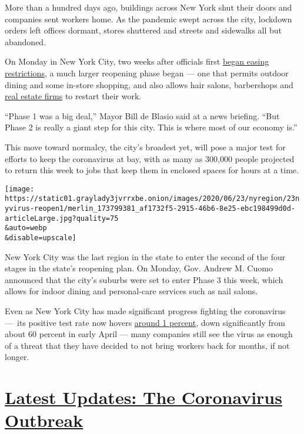 More than a hundred days ago, buildings across New York shut their doors
and companies sent workers home. As the pandemic swept across the city,
lockdown orders left offices dormant, stores shuttered and streets and
sidewalks all but abandoned.

On Monday in New York City, two weeks after officials first
\href{https://www.nytimes3xbfgragh.onion/2020/06/07/nyregion/new-york-reopening-coronavirus.html?module=inline}{began
easing restrictions}, a much larger reopening phase began --- one that
permits outdoor dining and some in-store shopping, and also allows hair
salons, barbershops and
\href{https://www.nytimes3xbfgragh.onion/2020/06/24/realestate/phase-2-showings.html}{real
estate firms} to restart their work.

``Phase 1 was a big deal,'' Mayor Bill de Blasio said at a news
briefing. ``But Phase 2 is really a giant step for this city. This is
where most of our economy is.''

This move toward normalcy, the city's broadest yet, will pose a major
test for efforts to keep the coronavirus at bay, with as many as 300,000
people projected to return this week to jobs that keep them in enclosed
spaces for hours at a time.

\texttt{[image: https://static01.graylady3jvrrxbe.onion/images/2020/06/23/nyregion/23nyvirus-reopen1/merlin\_173799381\_af1732f5-2915-46b6-8e25-ebc198499d0d-articleLarge.jpg?quality=75\\\&auto=webp\\\&disable=upscale]}

New York City was the last region in the state to enter the second of
the four stages in the state's reopening plan. On Monday, Gov. Andrew M.
Cuomo announced that the city's suburbs were set to enter Phase 3 this
week, which allows for indoor dining and personal-care services such as
nail salons.

Even as New York City has made significant progress fighting the
coronavirus ---~its positive test rate now hovers
\href{https://www1.nyc.gov/site/doh/covid/covid-19-data.page}{around 1
percent}, down significantly from about 60 percent in early April ---
many companies still see the virus as enough of a threat that they have
decided to not bring workers back for months, if not longer.

\hypertarget{latest-updates-the-coronavirus-outbreak}{%
\section{\texorpdfstring{\href{https://www.nytimes3xbfgragh.onion/2020/09/11/world/covid-19-coronavirus.html?action=click\&pgtype=Article\&state=default\&region=MAIN_CONTENT_1\&context=storylines_live_updates}{Latest
Updates: The Coronavirus
Outbreak}}{Latest Updates: The Coronavirus Outbreak}}\label{latest-updates-the-coronavirus-outbreak}}

